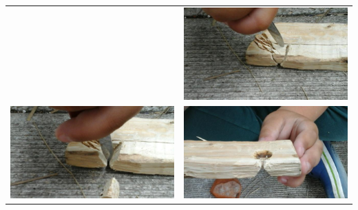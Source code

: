\documentclass[a4paper, handout]{beamer}
\begin{document}
\begin{frame}
\begin{tabular}{ c c }
		&
		\includegraphics[scale=0.15]{inkeping-4}
		\\
		\includegraphics[scale=0.15]{inkeping-5}
		&
		\includegraphics[scale=0.15]{inkeping-6}
		\\
	\end{tabular}
\end{frame}
\end{document}
